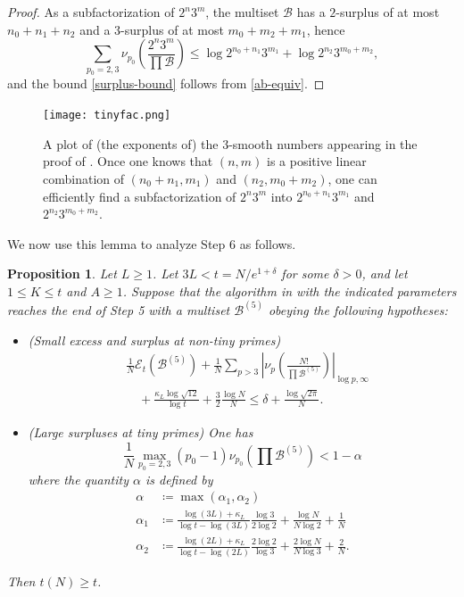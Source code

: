 \documentclass[12pt,a4paper,reqno]{amsart}
\numberwithin{equation}{section}
\theoremstyle{plain}
\newtheorem{proposition}[theorem]{Proposition}
\theoremstyle{definition}
\newcommand\tuple{{\mathcal B}}
\newcommand\excess{{\mathcal{E}}}
\begin{document}
\begin{proof}
  As a subfactorization of $2^n 3^m$, the multiset $\tuple$ has a $2$-surplus of at most $n_0+n_1+n_2$ and a $3$-surplus of at most $m_0+m_2+m_1$, hence
  $$ \sum_{p_0=2,3} \nu_{p_0}\left(\frac{2^n 3^m}{\prod \tuple}\right) \leq \log 2^{n_0+n_1} 3^{m_1} + \log 2^{n_2} 3^{m_0+m_2},$$
  and the bound \eqref{surplus-bound} follows from \eqref{ab-equiv}.
  \end{proof}

  \begin{figure}
    \centering
    \texttt{[image: tinyfac.png]}
    \caption{A plot of (the exponents of) the $3$-smooth numbers appearing in the proof of .  Once one knows that $(n,m)$ is a positive linear combination of $(n_0+n_1,m_1)$ and $(n_2,m_0+m_2)$, one can efficiently find a subfactorization of $2^n 3^m$ into $2^{n_0+n_1} 3^{m_1}$ and $2^{n_2} 3^{m_0+m_2}$.}
    \label{fig-tinyfac}
    \end{figure}
  
We now use this lemma to analyze Step 6 as follows.

\begin{proposition}\label{step6-reduce} Let $L \geq 1$.
  Let $3L < t = N/e^{1+\delta}$ for some $\delta>0$, and let $1 \leq K \leq t$ and $A \geq 1$.  Suppose that the algorithm in  with the indicated parameters reaches the end of Step 5 with a multiset $\tuple^{(5)}$ obeying the following hypotheses:
\begin{itemize}
  \item[(i)] (Small excess and surplus at non-tiny primes)
  \begin{equation}\label{new-balance-3}
  \begin{split}
    &\frac{1}{N} \excess_t(\tuple^{(5)}) + \frac{1}{N} \sum_{p>3} \left|\nu_p\left(\frac{N!}{\prod \tuple^{(5)}}\right)\right|_{\log p,\infty}  \\
    &\quad + \frac{\kappa_L \log \sqrt{12}}{\log t} + \frac{3}{2} \frac{\log N}{N} \leq \delta + \frac{\log \sqrt{2\pi}}{N}.
  \end{split}
  \end{equation}
  \item[(ii)] (Large surpluses at tiny primes) One has
\begin{equation}\label{qn} 
\frac{1}{N} \max_{p_0=2,3} (p_0-1) \nu_{p_0}\left(\prod \tuple^{(5)}\right) < 1-\alpha
\end{equation}
where the quantity $\alpha$ is defined by
\begin{equation}\label{qntl} 
  \begin{split}
\alpha &\coloneqq \max(\alpha_1,\alpha_2) \\
\alpha_1 &\coloneqq \frac{\log(3L)+\kappa_L}{\log t - \log(3L)} \frac{\log 3}{2 \log 2} + \frac{\log N}{N \log 2} + \frac{1}{N} \\
\alpha_2 &\coloneqq \frac{\log(2L)+\kappa_L}{\log t - \log(2L)} \frac{2\log 2}{\log 3} + \frac{2\log N}{N \log 3} + \frac{2}{N}.
  \end{split}
\end{equation}
\end{itemize}
Then $t(N) \geq t$.
\end{proposition}
\end{document}
